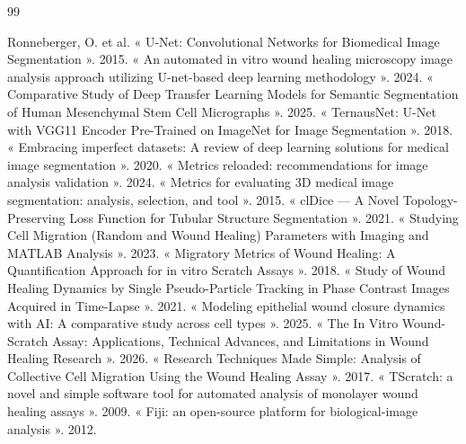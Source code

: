 \documentclass[12pt,a4paper]{report}
\begin{document}
\renewcommand{\bibname}{Bibliographie}
\begin{thebibliography}{99}

 Ronneberger, O. et al. « U-Net: Convolutional Networks for Biomedical Image Segmentation ». 2015.
 « An automated in vitro wound healing microscopy image analysis approach utilizing U-net-based deep learning methodology ». 2024.
 « Comparative Study of Deep Transfer Learning Models for Semantic Segmentation of Human Mesenchymal Stem Cell Micrographs ». 2025.
 « TernausNet: U-Net with VGG11 Encoder Pre-Trained on ImageNet for Image Segmentation ». 2018.
 « Embracing imperfect datasets: A review of deep learning solutions for medical image segmentation ». 2020.
 « Metrics reloaded: recommendations for image analysis validation ». 2024.
 « Metrics for evaluating 3D medical image segmentation: analysis, selection, and tool ». 2015.
 « clDice --- A Novel Topology-Preserving Loss Function for Tubular Structure Segmentation ». 2021.
 « Studying Cell Migration (Random and Wound Healing) Parameters with Imaging and MATLAB Analysis ». 2023.
 « Migratory Metrics of Wound Healing: A Quantification Approach for in vitro Scratch Assays ». 2018.
 « Study of Wound Healing Dynamics by Single Pseudo-Particle Tracking in Phase Contrast Images Acquired in Time-Lapse ». 2021.
 « Modeling epithelial wound closure dynamics with AI: A comparative study across cell types ». 2025.
 « The In Vitro Wound-Scratch Assay: Applications, Technical Advances, and Limitations in Wound Healing Research ». 2026.
 « Research Techniques Made Simple: Analysis of Collective Cell Migration Using the Wound Healing Assay ». 2017.
 « TScratch: a novel and simple software tool for automated analysis of monolayer wound healing assays ». 2009.
 « Fiji: an open-source platform for biological-image analysis ». 2012.

\end{thebibliography}
\end{document}
